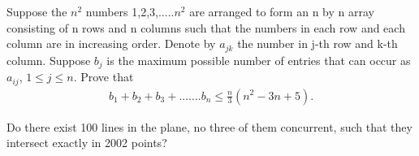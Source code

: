 \item Suppose the $n^{2}$ numbers 1,2,3,.....$n^{2}$ are arranged to form an n by n array consisting of n rows and n columns such that the numbers in each row and each column are in increasing order. Denote by $a_{jk}$ the number in j-th row and k-th column. Suppose $b_{j}$ is the maximum possible number of entries that can occur as $a_{ij}$, $1 \leq j \leq n$. Prove that
\begin{align*}
b_1 + b_2 + b_3 +.......b_n \leq \frac{n}{3}(n^{2} - 3n + 5).
\end{align*}

\item Do there exist 100 lines in the plane, no three of them concurrent, such that they intersect exactly in 2002 points?





